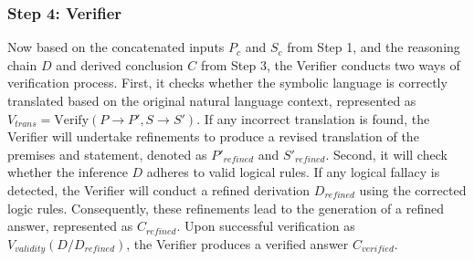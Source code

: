 \documentclass[10pt,a4paper]{article}
\begin{document}
\begin{multicols}{2}
\subsubsection*{Step 4: Verifier}

Now based on the concatenated inputs $P_c$ and $S_c$ from Step 1, and the reasoning chain $D$ and derived conclusion $C$ from Step 3, the Verifier conducts two ways of verification process. First, it checks whether the symbolic language is correctly translated based on the original natural language context, represented as $V_{trans} = \text{Verify}(P \rightarrow P', S \rightarrow S')$. If any incorrect translation is found, the Verifier will undertake refinements to produce a revised translation of the premises and statement, denoted as $P'_{refined}$ and $S'_{refined}$. Second, it will check whether the inference $D$ adheres to valid logical rules. If any logical fallacy is detected, the Verifier will conduct a refined derivation $D_{refined}$ using the corrected logic rules. Consequently, these refinements lead to the generation of a refined answer, represented as $C_{refined}$. Upon successful verification as $V_{validity}(D / D_{refined})$, the Verifier produces a verified answer $C_{verified}$.

\end{multicols}
\end{document}
